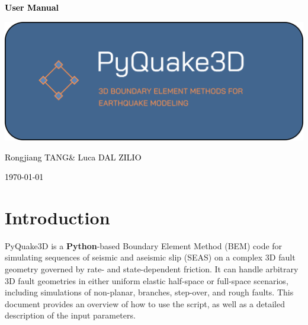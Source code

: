 \documentclass[a4paper,12pt]{article}
\begin{document}
\pagecolor{mycolor}

\begin{titlepage}
    \begin{center}
        {\Huge \textcolor{black}{\textbf{User Manual}}}
        \vspace{1.5cm} %
        
        \includegraphics[width=1.0\textwidth]{Logo-PyQuake3D.png}
        \vspace{1.5cm} %

        {\large \textcolor{black}{Rongjiang TANG\footnotemark[1] \& Luca DAL ZILIO\footnotemark[2]}}
        \vspace{1.5cm} %
        
        \vspace{1cm} %
        {\large \textcolor{black}{\today}}
        
    \end{center}


\end{titlepage}

\pagecolor{white}

\newpage
\tableofcontents
\newpage

\section{Introduction}
PyQuake3D is a \textbf{Python}-based Boundary Element Method (BEM) code for simulating sequences of seismic and aseismic slip (SEAS) on a complex 3D fault geometry governed by rate- and state-dependent friction. It can handle arbitrary 3D fault geometries in either uniform elastic half-space or full-space scenarios, including simulations of non-planar, branches, step-over, and rough faults. This document provides an overview of how to use the script, as well as a detailed description of the input parameters.
\end{document}
